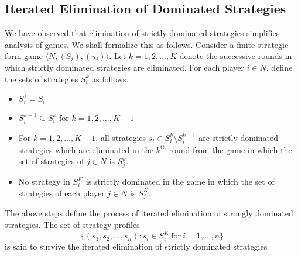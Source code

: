 \subsection{Iterated Elimination of Dominated Strategies}
We have observed that elimination of strictly dominated strategies simplifies analysis of games.
We shall formalize this as follows.
Consider a finite strategic form game $\langle N,(S_i),(u_i)\rangle$.
Let $k = 1, 2,\ldots,K$ denote the successive rounds in which strictly dominated strategies are eliminated.
For each player $i \in N$, define the sets of strategies $S_i^k$ as follows.
\begin{itemize}
	\item $S_i^1=S_i$
	\item $S_i^{k+1}\subseteq S_i^k$ for $k=1,2,\ldots,K-1$
	\item For $k=1,2,\ldots,K-1$, all strategies $s_i\in S_i^k\setminus S_i^{k+1}$ are strictly dominated strategies which are eliminated in the $k^{\text{th}}$ round from the game in which the set of strategies of $j\in N$ is $S_j^k$.
	\item No strategy in $S_i^K$ is strictly dominated in the game in which the set of strategies of each player $j\in N$ is $S_j^K$.
\end{itemize}
The above steps define the process of iterated elimination of strongly dominated strategies.
The set of strategy profiles
\[\{(s_1,s_2,\ldots,s_n):s_i\in S_i^K\ \text{for}\ i=1,\ldots,n\}\]
is said to survive the iterated elimination of strictly dominated strategies